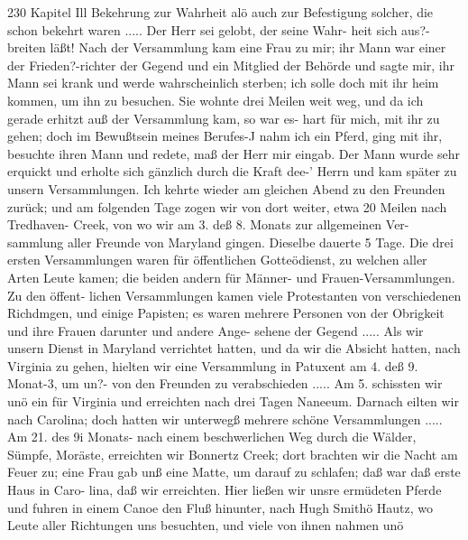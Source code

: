 230 Kapitel Ill
Bekehrung zur Wahrheit alö auch zur Befestigung solcher, die
schon bekehrt waren ..... Der Herr sei gelobt, der seine Wahr-
heit sich aus?-breiten läßt! Nach der Versammlung kam eine Frau
zu mir; ihr Mann war einer der Frieden?-richter der Gegend
und ein Mitglied der Behörde und sagte mir, ihr Mann
sei krank und werde wahrscheinlich sterben; ich solle doch mit ihr
heim kommen, um ihn zu besuchen. Sie wohnte drei Meilen weit
weg, und da ich gerade erhitzt auß der Versammlung kam, so war
es- hart für mich, mit ihr zu gehen; doch im Bewußtsein meines
Berufes-J nahm ich ein Pferd, ging mit ihr, besuchte ihren Mann
und redete, maß der Herr mir eingab. Der Mann wurde sehr
erquickt und erholte sich gänzlich durch die Kraft dee-’ Herrn und
kam später zu unsern Versammlungen. Ich kehrte wieder am
gleichen Abend zu den Freunden zurück; und am folgenden Tage
zogen wir von dort weiter, etwa 20 Meilen nach Tredhaven-
Creek, von wo wir am 3. deß 8. Monats zur allgemeinen Ver-
sammlung aller Freunde von Maryland gingen. Dieselbe dauerte
5 Tage. Die drei ersten Versammlungen waren für öffentlichen
Gotteödienst, zu welchen aller Arten Leute kamen; die beiden
andern für Männer- und Frauen-Versammlungen. Zu den öffent-
lichen Versammlungen kamen viele Protestanten von verschiedenen
Richdmgen, und einige Papisten; es waren mehrere Personen
von der Obrigkeit und ihre Frauen darunter und andere Ange-
sehene der Gegend .....
Als wir unsern Dienst in Maryland verrichtet hatten, und
da wir die Absicht hatten, nach Virginia zu gehen, hielten wir
eine Versammlung in Patuxent am 4. deß 9. Monat-3, um un?-
von den Freunden zu verabschieden .....
Am 5. schissten wir unö ein für Virginia und erreichten nach
drei Tagen Naneeum. Darnach eilten wir nach Carolina; doch
hatten wir unterwegß mehrere schöne Versammlungen ..... Am
21. des 9i Monats- nach einem beschwerlichen Weg durch die
Wälder, Sümpfe, Moräste, erreichten wir Bonnertz Creek; dort
brachten wir die Nacht am Feuer zu; eine Frau gab unß eine
Matte, um darauf zu schlafen; daß war daß erste Haus in Caro-
lina, daß wir erreichten.
Hier ließen wir unsre ermüdeten Pferde und fuhren in einem
Canoe den Fluß hinunter, nach Hugh Smithö Hautz, wo Leute
aller Richtungen uns besuchten, und viele von ihnen nahmen unö


